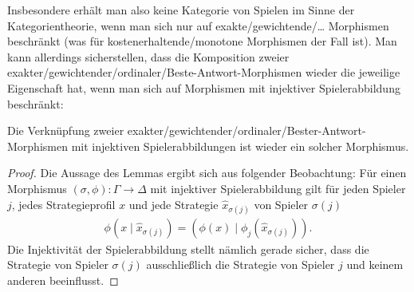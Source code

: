 Insbesondere erhält man also keine Kategorie von Spielen im Sinne der Kategorientheorie, wenn man sich nur auf exakte/gewichtende/\dots{} Morphismen beschränkt (was für kostenerhaltende/monotone Morphismen der Fall ist). Man kann allerdings sicherstellen, dass die Komposition zweier exakter/gewichtender/ordinaler/Beste-Antwort-Morphismen wieder die jeweilige Eigenschaft hat, wenn man sich auf Morphismen mit injektiver Spielerabbildung beschränkt:

\begin{lemma}\label{lemma:KompositionVonMorphismen}
	Die Verknüpfung zweier exakter/gewichtender/ordinaler/Bester-Antwort-Morphismen mit injektiven Spielerabbildungen ist wieder ein solcher Morphismus.
\end{lemma}

\begin{proof}
	Die Aussage des Lemmas ergibt sich aus folgender Beobachtung: Für einen Morphismus $(\sigma, \phi): \Gamma \to \Delta$ mit injektiver Spielerabbildung gilt für jeden Spieler $j$, jedes Strategieprofil $x$ und jede Strategie $\hat{x}_{\sigma(j)}$ von Spieler $\sigma(j)$
		\begin{align}\label{eq:StrategiewechselFuerInjektiveSpielerabbildung}
			\phi(x \mid \hat{x}_{\sigma(j)}) = (\phi(x) \mid \phi_{j}(\hat{x}_{\sigma(j)})).
		\end{align}
	Die Injektivität der Spielerabbildung stellt nämlich gerade sicher, dass die Strategie von Spieler $\sigma(j)$ ausschließlich die Strategie von Spieler $j$ und keinem anderen beeinflusst.
	

\end{proof}
